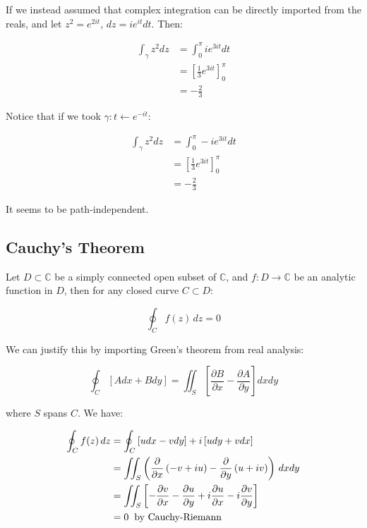 \documentclass{../../physics_notes}
\begin{document}
If we instead assumed that complex integration can be directly imported from the reals, and let $z^2 = e^{2it}$, $dz = ie^{it}dt$. Then:

\begin{align*}
\int_\gamma z^2 dz &= \int_{0}^{\pi} ie^{3it} dt \\
&= \left[\frac{1}{3}e^{3it}\right]_{0}^{\pi} \\
&= -\frac{2}{3}
\end{align*}

Notice that if we took $\gamma: t \leftarrow e^{-it}$:

\begin{align*}
\int_\gamma z^2 dz &= \int_{0}^{\pi} -ie^{3it} dt \\
&= \left[\frac{1}{3}e^{3it}\right]_{0}^{\pi} \\
&= -\frac{2}{3}
\end{align*}

It seems to be path-independent. 

\subsection{Cauchy's Theorem }

Let $D \subset \mathbb{C}$ be a simply connected open subset of $\mathbb{C}$, and $f: D \rightarrow \mathbb{C}$ be an analytic function in $D$, then for any closed curve $C \subset D$:

\[ \oint_C f(z) \,dz = 0 \]

We can justify this by importing Green's theorem from real analysis:

\[ \oint_C \left[ Adx + Bdy \right] = \iint_S \left[ \frac{\partial B}{\partial x} - \frac{\partial A}{\partial y} \right] dx dy \]

where $S$ spans $C$. We have:

\begin{align*}
\oint_C f(z)\, dz &= \oint_C \left[ udx - vdy \right] + i\left[udy + vdx\right] \\
&= \iint_S \left(\frac{\partial}{\partial x}\left(-v + iu\right) - \frac{\partial}{\partial y}\left(u + iv\right)\right)\, dxdy \\
&= \iint_S \left[-\frac{\partial v}{\partial x} - \frac{\partial u}{\partial y} + i\frac{\partial u}{\partial x} - i\frac{\partial v}{\partial y}\right] \\
&= 0 \hspace{.2cm} \text{by Cauchy-Riemann}
\end{align*}
\end{document}
